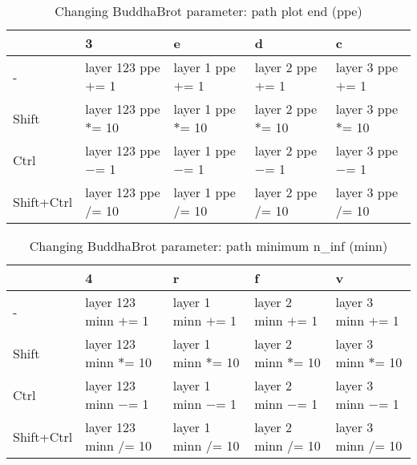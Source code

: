 \documentclass[10pt,a4paper]{article}
\begin{document}
\begin{table}[h!]
    \caption{Changing BuddhaBrot parameter: path plot end (ppe)}
    \setlength{\tabcolsep}{0.0pt}
    \begin{tabularx}{\linewidth}{LLLLL}
        \toprule
                   & 3                      & e                    & d                    & c                    \\
        \midrule                                                                          
        -          & layer 123 ppe $+$= 1  & layer 1 ppe $+$= 1  & layer 2 ppe $+$= 1  & layer 3 ppe $+$= 1  \\
        Shift      & layer 123 ppe $*$= 10 & layer 1 ppe $*$= 10 & layer 2 ppe $*$= 10 & layer 3 ppe $*$= 10 \\
        Ctrl       & layer 123 ppe $-$= 1  & layer 1 ppe $-$= 1  & layer 2 ppe $-$= 1  & layer 3 ppe $-$= 1  \\
        Shift+Ctrl & layer 123 ppe $/$= 10 & layer 1 ppe $/$= 10 & layer 2 ppe $/$= 10 & layer 3 ppe $/$= 10 \\
        \bottomrule
    \end{tabularx}
\end{table}

\begin{table}[h!]
    \caption{Changing BuddhaBrot parameter: path minimum n\_inf (minn)}
    \setlength{\tabcolsep}{0.0pt}
    \begin{tabularx}{\linewidth}{LLLLL}
        \toprule
                   & 4                      & r                    & f                    & v                    \\
        \midrule                                                                          
        -          & layer 123 minn $+$= 1  & layer 1 minn $+$= 1  & layer 2 minn $+$= 1  & layer 3 minn $+$= 1  \\
        Shift      & layer 123 minn $*$= 10 & layer 1 minn $*$= 10 & layer 2 minn $*$= 10 & layer 3 minn $*$= 10 \\
        Ctrl       & layer 123 minn $-$= 1  & layer 1 minn $-$= 1  & layer 2 minn $-$= 1  & layer 3 minn $-$= 1  \\
        Shift+Ctrl & layer 123 minn $/$= 10 & layer 1 minn $/$= 10 & layer 2 minn $/$= 10 & layer 3 minn $/$= 10 \\
        \bottomrule
    \end{tabularx}
\end{table}
\end{document}
